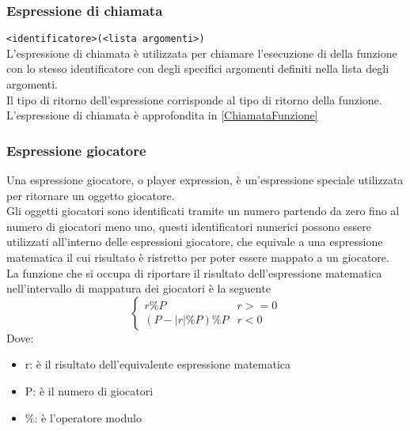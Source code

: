 \subsubsection{Espressione di chiamata}
\lstinline|<identificatore>(<lista argomenti>)| \\
L'espressione di chiamata è utilizzata per chiamare l'esecuzione di della funzione con lo 
stesso identificatore con degli specifici argomenti definiti nella lista degli argomenti. \\
Il tipo di ritorno dell'espressione corrisponde al tipo di ritorno della funzione. \\
L'espressione di chiamata è approfondita in \ref*{ChiamataFunzione}

\subsubsection{Espressione giocatore} \label{EspressioniGiocatore}
Una espressione giocatore, o player expression, è un'espressione speciale utilizzata per ritornare 
un oggetto giocatore.  \\
Gli oggetti giocatori sono identificati tramite un numero partendo da zero fino al numero di giocatori meno uno,
questi identificatori numerici possono essere utilizzati all'interno delle espressioni giocatore, che equivale 
a una espressione matematica il cui risultato è ristretto per poter essere mappato a un giocatore. \\
La funzione che si occupa di riportare il risultato dell'espressione matematica nell'intervallo di 
mappatura dei giocatori è la seguente
\[
\begin{cases}
    r \% P  & r >= 0 \\
    (P - |r| \% P) \% P & r < 0
\end{cases}
\] 
Dove:
\begin{itemize}
    \item r: è il risultato dell'equivalente espressione matematica
    \item P: è il numero di giocatori
    \item \%: è l'operatore modulo
\end{itemize}

